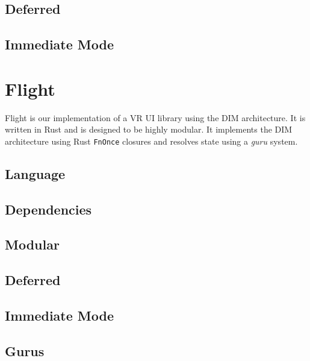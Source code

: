 \documentclass[conference,12pt]{IEEEtran}
\begin{document}
\subsection{Deferred}

\subsection{Immediate Mode}

\section{Flight}
Flight is our implementation of a VR UI library using the DIM architecture. It
is written in Rust and is designed to be highly modular. It implements the DIM
architecture using Rust \texttt{FnOnce} closures and resolves state using a
\textit{guru} system.

\subsection{Language}

\subsection{Dependencies}

\subsection{Modular}

\subsection{Deferred}

\subsection{Immediate Mode}

\subsection{Gurus} %
\end{document}
